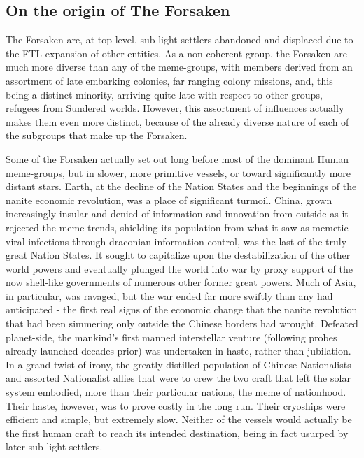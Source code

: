 \subsection{On the origin of The Forsaken}

The Forsaken are, at top level, sub-light settlers abandoned and
displaced due to the FTL expansion of other entities. As a
non-coherent group, the Forsaken are much more diverse than any of the
meme-groups, with members derived from an assortment of late embarking
colonies, far ranging colony missions, and, this being a distinct
minority, arriving quite late with respect to other groups, refugees
from Sundered worlds. However, this assortment of influences actually
makes them even more distinct, because of the already diverse nature
of each of the subgroups that make up the Forsaken.

Some of the Forsaken actually set out long before most of the dominant
Human meme-groups, but in slower, more primitive vessels, or toward
significantly more distant stars. Earth, at the decline of the Nation
States and the beginnings of the nanite economic revolution, was a
place of significant turmoil. China, grown increasingly insular and
denied of information and innovation from outside as it rejected the
meme-trends, shielding its population from what it saw as memetic
viral infections through draconian information control, was the last
of the truly great Nation States. It sought to capitalize upon the
destabilization of the other world powers and eventually plunged the
world into war by proxy support of the now shell-like governments of
numerous other former great powers. Much of Asia, in particular, was
ravaged, but the war ended far more swiftly than any had anticipated -
the first real signs of the economic change that the nanite revolution
that had been simmering only outside the Chinese borders had
wrought. Defeated planet-side, the mankind's first manned interstellar
venture (following probes already launched decades prior) was
undertaken in haste, rather than jubilation. In a grand twist of
irony, the greatly distilled population of Chinese Nationalists and
assorted Nationalist allies that were to crew the two craft that left
the solar system embodied, more than their particular nations, the
meme of nationhood. Their haste, however, was to prove costly in the
long run. Their cryoships were efficient and simple, but extremely
slow. Neither of the vessels would actually be the first human craft
to reach its intended destination, being in fact usurped by later
sub-light settlers.

